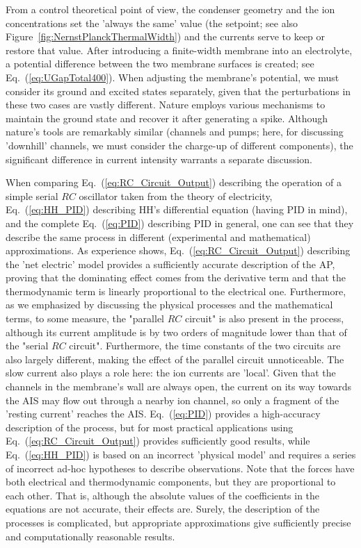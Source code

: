 From a control theoretical point of view, the condenser geometry and the ion concentrations set
the 'always the same' value (the setpoint; see also Figure~\ref{fig:NernstPlanckThermalWidth}) and the currents serve to keep or restore
that value.
After introducing a finite-width membrane into an electrolyte,
a potential difference between the two membrane surfaces is created; see Eq.~(\ref{eq:UGapTotal400}).
When adjusting the membrane's potential, we must consider its ground and excited states separately,
given that the perturbations in these two cases are vastly different. Nature employs various mechanisms to maintain the ground state and recover it after generating a spike. Although nature's tools are remarkably similar (channels and pumps; here, for discussing 'downhill' channels, we must consider the charge-up of different components), the significant difference in current intensity warrants a separate discussion.


When comparing Eq.~(\ref{eq:RC_Circuit_Output}) describing the operation of a simple serial $RC$ oscillator taken from the theory of electricity,  Eq.~(\ref{eq:HH_PID}) describing \gls{HH}'s differential equation
(having \gls{PID} in mind),  and the complete Eq.~(\ref{eq:PID}) describing \gls{PID} in general, one can see that they describe the 
same process in different (experimental and mathematical) approximations.
As experience shows, Eq.~(\ref{eq:RC_Circuit_Output}) describing 
the 'net electric' model provides a sufficiently accurate description
of the \gls{AP}, proving that the dominating effect comes from the derivative term and that the thermodynamic term is linearly proportional to the
electrical one. Furthermore, as we emphasized by discussing the 
physical processes and the mathematical terms, to some measure, 
the "parallel $RC$ circuit" is also present in the process, although
its current amplitude is by two orders of magnitude 
lower than that of the "serial $RC$ circuit". Furthermore, the time constants of the two circuits are also largely different, making the effect of the parallel circuit unnoticeable. 
The slow current also plays a role here: the ion currents are 'local'. 
Given that the channels in the membrane's wall are always open, the current on its way towards the \gls{AIS} may flow out
through a nearby ion channel, so only a fragment of the 'resting current' reaches the \gls{AIS}.
Eq.~(\ref{eq:PID})
provides a high-accuracy description of the process, but for most 
practical applications using Eq.~(\ref{eq:RC_Circuit_Output})
provides sufficiently good results, while Eq.~(\ref{eq:HH_PID}) is based
on an incorrect 'physical model' and requires a series of incorrect ad-hoc hypotheses to describe observations.
Note that the forces have both electrical and thermodynamic components, but they are proportional to each other. That is, although the absolute values of the coefficients in the equations are not accurate, their effects are.
Surely, the description of the processes
is complicated, but appropriate approximations give sufficiently
precise and computationally reasonable results.



